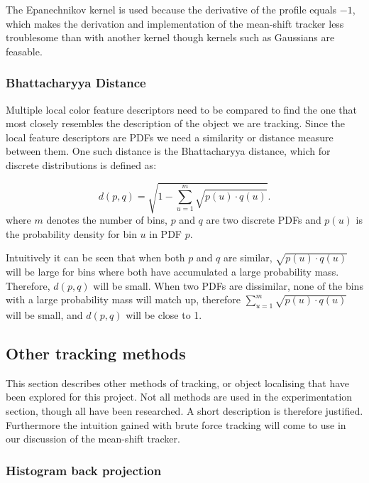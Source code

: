 \documentclass[a4paper,11pt]{article}
\begin{document}
The Epanechnikov kernel is used because the derivative of the profile equals $-1$, which makes the derivation and implementation of the mean-shift tracker less troublesome than with another kernel though kernels such as Gaussians are feasable.

\subsubsection{Bhattacharyya Distance}

Multiple local color feature descriptors need to be compared to find the one that most closely resembles the description of the object we are tracking. Since the local feature descriptors are PDFs we need a similarity or distance measure between them. One such distance is the Bhattacharyya distance, which for discrete distributions is defined as:

\begin{equation}
\label{eq:bhattdistance}
d(p,q) = \sqrt{1-\sum_{u=1}^{m} \sqrt{p(u)\cdot q(u)}}.
\end{equation}
where $m$ denotes the number of bins, $p$ and $q$ are two discrete PDFs and $p(u)$ is the probability density for bin $u$ in PDF $p$. 

Intuitively it can be seen that when both $p$ and $q$ are similar, $\sqrt{p(u)\cdot q(u)}$ will be large for bins where both have accumulated a large probability mass. Therefore, $d(p,q)$ will be small. When two PDFs are dissimilar, none of the bins with a large probability mass will match up, therefore  $\sum_{u=1}^{m} \sqrt{p(u)\cdot q(u)}$ will be small, and $d(p,q)$ will be close to 1.

\subsection{Other tracking methods}

This section describes other methods of tracking, or object localising that have been explored for this project. Not all methods are used in the experimentation section, though all have been researched. A short description is therefore justified. Furthermore the intuition gained with brute force tracking will come to use in our discussion of the mean-shift tracker.

\subsubsection{Histogram back projection}
\end{document}
